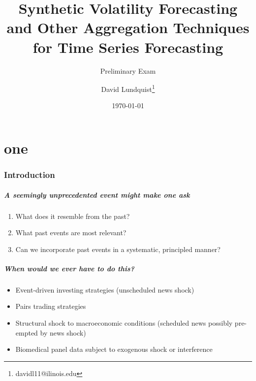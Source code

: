 \documentclass{beamer}
\title{Synthetic Volatility Forecasting and Other Aggregation Techniques for Time Series Forecasting}
\subtitle{Preliminary Exam}
\author{David Lundquist\thanks{davidl11@ilinois.edu}}
\date{\today}
\theoremstyle{definition}
\begin{document}
\part{one}
\begin{frame}
\titlepage
\end{frame}

\section{Introduction}

\begin{frame}
\frametitle{A seemingly unprecedented event might make one ask}
\begin{enumerate}
    \item What does it resemble from the past?
    \item What past events are most relevant?
    \item Can we incorporate past events in a systematic, principled manner?
\end{enumerate}
\end{frame}

\begin{frame}
    \frametitle{When would we ever have to do this?}

    \begin{itemize}
        \item Event-driven investing strategies (unscheduled news shock)
        \item Pairs trading strategies
        \item Structural shock to macroeconomic conditions (scheduled news possibly pre-empted by news shock)
        \item Biomedical panel data subject to exogenous shock or interference
    \end{itemize}
\end{frame}
\end{document}
